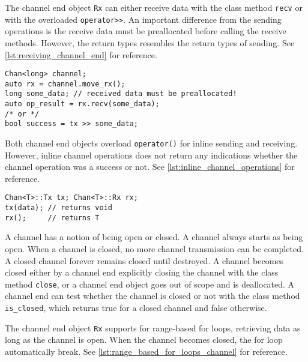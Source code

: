 The channel end object \lstinline[style={CustomC++}]|Rx| can either receive data with the class method \lstinline[style={CustomC++}]|recv| or with the overloaded \lstinline[style={CustomC++}]|operator>>|. An important difference from the sending operations is the receive data must be preallocated before calling the receive methods. However, the return types resembles the return types of sending. See \cref{lst:receiving_channel_end} for reference.

\begin{lstfloat}
\begin{lstlisting}[caption={Receiving on the Rx channel end object.}, label={lst:receiving_channel_end}, style={CustomC++}, xleftmargin={2em}]
Chan<long> channel;
auto rx = channel.move_rx();
long some_data; // received data must be preallocated!
auto op_result = rx.recv(some_data); 
/* or */
bool success = tx >> some_data;
\end{lstlisting}
\end{lstfloat}

Both channel end objects overload \lstinline[style={CustomC++}]|operator()| for inline sending and receiving. However, inline channel operations does not return any indications whether the channel operation was a success or not. See \cref{lst:inline_channel_operations} for reference.

\begin{lstfloat}
\begin{lstlisting}[caption={Inline channel operations.}, label={lst:inline_channel_operations}, style={CustomC++}, xleftmargin={2em}]
Chan<T>::Tx tx; Chan<T>::Rx rx;
tx(data); // returns void
rx();     // returns T
\end{lstlisting}
\end{lstfloat}

A channel has a notion of being open or closed. A channel always starts as being open. When a channel is closed, no more channel transmission can be completed. A closed channel forever remains closed until destroyed. A channel becomes closed either by a channel end explicitly closing the channel with the class method \lstinline[style={CustomC++}]|close|, or a channel end object goes out of scope and is deallocated. A channel end can test whether the channel is closed or not with the class method \lstinline[style={CustomC++}]|is_closed|, which returns true for a closed channel and false otherwise.

The channel end object \lstinline[style={CustomC++}]|Rx| supports for range\hyp{}based for loops, retrieving data as long as the channel is open. When the channel becomes closed, the for loop automatically break. See \cref{lst:range_based_for_loops_channel} for reference.

